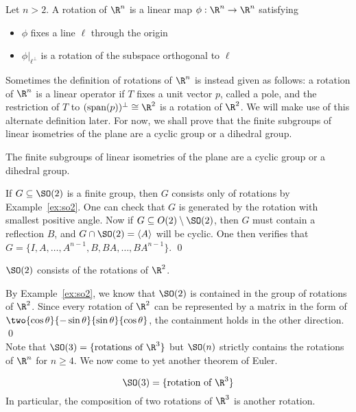 \begin{dfn}[Rotation of $\R^n$]
Let $n>2$. A rotation of $\R^n$ is a linear map $\phi: \R^n \to \R^n$ satisfying
	\begin{itemize}
	\item $\phi$ fixes a line $\ell$ through the origin
	\item $\phi \big|_{\ell^\perp}$ is a rotation of the subspace orthogonal to $\ell$
	\end{itemize}
\end{dfn}


Sometimes the definition of rotations of $\R^n$ is instead given as follows: a rotation of $\R^n$ is a linear operator if $T$ fixes a unit vector $p$, called a pole, and the  restriction of $T$ to $(\text{span}(p))^\perp \cong \R^2$ is a rotation of $\R^2$. We will make use of this alternate definition later. For now, we shall prove that the finite subgroups of linear isometries of the plane are a cyclic group or a dihedral group. 


\begin{thm}
The finite subgroups of linear isometries of the plane are a cyclic group or a dihedral group. 
\end{thm}

\pfsk If $G \subseteq \SO(2)$ is a finite group, then $G$ consists only of rotations by Example~\ref{ex:so2}. One can check that $G$ is generated by the rotation with smallest positive angle. Now if $G \subseteq O(2) \setminus \SO(2)$, then $G$ must contain a reflection $B$, and $G \cap \SO(2)= \langle A \rangle$ will be cyclic. One then verifies that $G= \{I,A, \ldots, A^{n-1}, B, BA, \ldots, BA^{n-1}\}$. \qed \\


\begin{cor}
$\SO(2)$ consists of the rotations of $\R^2$. 
\end{cor}

\pf By Example~\ref{ex:so2}, we know that $\SO(2)$ is contained in the group of rotations of $\R^2$. Since every rotation of $\R^2$ can be represented by a matrix in the form of $\two{\cos\theta}{-\sin\theta}{\sin\theta}{\cos\theta}$, the containment holds in the other direction. \qed \\


Note that $\SO(3)=\{\text{rotations of }\R^3\}$ but $\SO(n)$ strictly contains the rotations of $\R^n$ for $n \geq 4$. We now come to yet another theorem of Euler. 


\begin{thm} \label{thm:eulerthm}
	\[
	\SO(3)= \{\text{rotation of }\R^3\}
	\]
In particular, the composition of two rotations of $\R^3$ is another rotation.
\end{thm}

